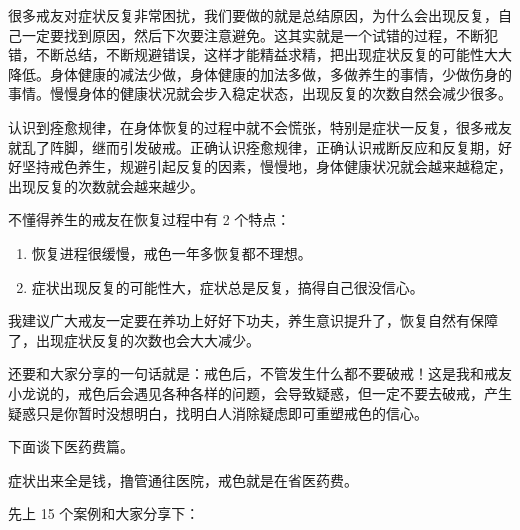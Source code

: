 \documentclass[fontset=founder]{ctexart}
\begin{document}
很多戒友对症状反复非常困扰，我们要做的就是总结原因，为什么会出现反复，自己一定要找到原因，然后下次要注意避免。这其实就是一个试错的过程，不断犯错，不断总结，不断规避错误，这样才能精益求精，把出现症状反复的可能性大大降低。身体健康的减法少做，身体健康的加法多做，多做养生的事情，少做伤身的事情。慢慢身体的健康状况就会步入稳定状态，出现反复的次数自然会减少很多。

认识到痊愈规律，在身体恢复的过程中就不会慌张，特别是症状一反复，很多戒友就乱了阵脚，继而引发破戒。正确认识痊愈规律，正确认识戒断反应和反复期，好好坚持戒色养生，规避引起反复的因素，慢慢地，身体健康状况就会越来越稳定，出现反复的次数就会越来越少。

不懂得养生的戒友在恢复过程中有 2 个特点：

\begin{enumerate}
    \item 恢复进程很缓慢，戒色一年多恢复都不理想。
    \item 症状出现反复的可能性大，症状总是反复，搞得自己很没信心。
\end{enumerate}

我建议广大戒友一定要在养功上好好下功夫，养生意识提升了，恢复自然有保障了，出现症状反复的次数也会大大减少。

还要和大家分享的一句话就是：戒色后，不管发生什么都不要破戒！这是我和戒友小龙说的，戒色后会遇见各种各样的问题，会导致疑惑，但一定不要去破戒，产生疑惑只是你暂时没想明白，找明白人消除疑虑即可重塑戒色的信心。

下面谈下医药费篇。

症状出来全是钱，撸管通往医院，戒色就是在省医药费。

先上 15 个案例和大家分享下：
\end{document}

